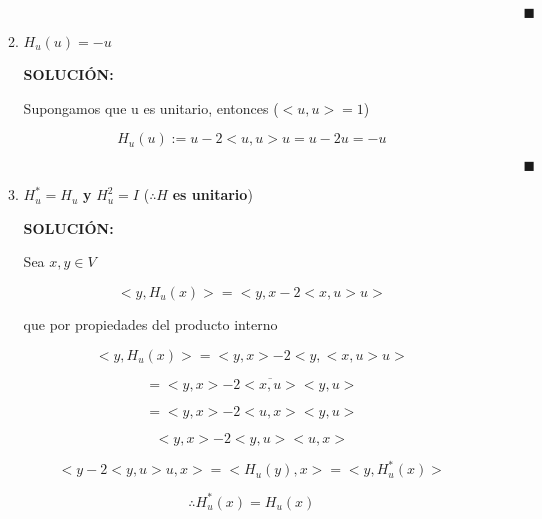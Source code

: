 \documentclass[12pt,a4paper]{article}
\begin{document}
\begin{enumerate}
\begin{enumerate}
        $\hspace{15cm} \blacksquare$
        
        \item $H_u(u)=-u$
        
        \textbf{SOLUCIÓN:}
        
        Supongamos que u es unitario, entonces ($<u,u>=1$)
        
        \begin{equation*}
            H_u(u):= u-2<u,u>u=u-2u=-u
        \end{equation*}
        
        $\hspace{15cm} \blacksquare$
        
        \item $H_u^* =H_u$ \textbf{y}  $H_u^2=I$ ($\therefore H$ \textbf{es unitario})
        
        \textbf{SOLUCIÓN:}
        
        Sea $x,y \in V$
        
        \begin{equation*}
            <y,H_u(x)>= <y,x-2<x,u>u>
        \end{equation*}
        
        que por propiedades del producto interno
        
        \begin{equation*}
            <y,H_u(x)>= <y,x>-2<y,<x,u>u>
        \end{equation*}
        
        \begin{equation*}
            =<y,x>-2\overline{<x,u>}<y,u>
        \end{equation*}
        
        \begin{equation*}
            =<y,x>-2<u,x><y,u>
        \end{equation*}
        
        \begin{equation*}
            <y,x>-2<y,u><u,x>
        \end{equation*}
        
        \begin{equation*}
            <y-2<y,u>u,x>=<H_u(y),x>=<y,H_u^*(x)>
        \end{equation*}
        
        \begin{equation*}
            \therefore H_u^*(x)=H_u(x)
        \end{equation*}
        

\end{enumerate}
\end{enumerate}
\end{document}
